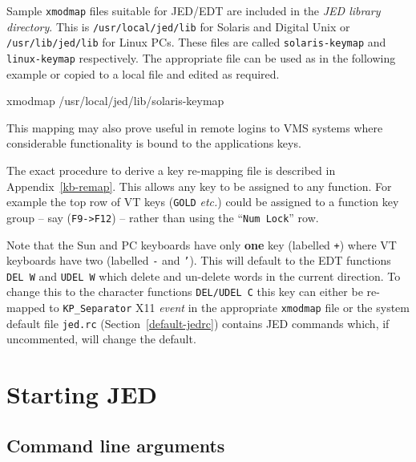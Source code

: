 \documentclass[twoside,11pt]{starlink}
\begin{document}
Sample \texttt{xmodmap} files suitable for JED/EDT are included in the
\textit{JED library directory}. This is \texttt{/usr/local/jed/lib} for
Solaris and Digital Unix or \texttt{/usr/lib/jed/lib} for Linux PCs.
These files are called \texttt{solaris-keymap} and
\texttt{linux-keymap} respectively. The appropriate file can be used as
in the following example or copied to a local file and edited as
required.

\begin{terminalv}
xmodmap /usr/local/jed/lib/solaris-keymap
\end{terminalv}

This mapping may also prove useful in remote logins to VMS systems
where considerable functionality is bound to the applications keys.

The exact procedure to derive a key re-mapping file is described in
Appendix~{\ref{kb-remap}}. This allows any
key to be assigned to any function. For example the top row of VT keys
(\texttt{GOLD} \textit{etc.}) could be assigned  to a function key group --
say (\texttt{F9->F12}) -- rather than using the
``\texttt{Num Lock}'' row.

Note that the Sun and PC keyboards have only \textbf{one} key (labelled
\texttt{+}) where VT keyboards have two (labelled \texttt{-} and
\texttt{'}). This will default to the EDT
functions \texttt{DEL~W} and \texttt{UDEL~W} which delete and un-delete
words in the current direction. To change this to the character
functions \texttt{DEL/UDEL~C} this key can either be re-mapped to
\texttt{KP\_Separator} X11 \textit{event} in the appropriate
\texttt{xmodmap} file or
the system default file \texttt{jed.rc} (Section~{\ref{default-jedrc}})
contains JED commands which, if uncommented, will change the default.

\section{Starting JED}
\label{starting_jed}

\subsection{Command line arguments}
\label{command_line_arguments}
\label{cl-switches}
\end{document}
